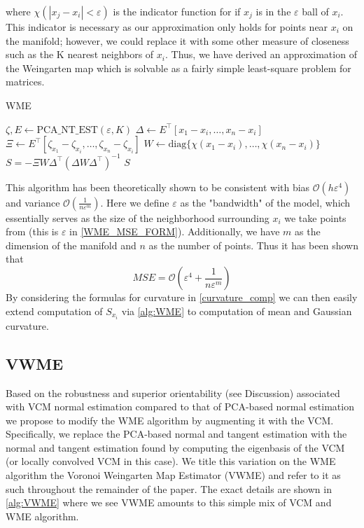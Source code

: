 \documentclass{article}
\begin{document}
where $\chi(|x_j - x_i| < \varepsilon)$ is the indicator function for if $x_j$ is in the $\varepsilon$ ball of $x_i$. This indicator is necessary as our approximation only holds for points near $x_i$ on the manifold; however, we could replace it with some other measure of closeness such as the K nearest neighbors of $x_i$. Thus, we have derived an approximation of the Weingarten map which is solvable as a fairly simple least-square problem for matrices.     
\begin{algorithm}
\caption{WME}\label{alg:WME}
\begin{algorithmic}[1]
\State $\zeta,  E \gets \text{PCA\_NT\_EST}(\varepsilon,K)$ 
\State $\Delta \gets E^\intercal [x_1 - x_i,\ldots,x_n - x_i]$
\State $\Xi \gets E^\intercal [\zeta_{x_1} - \zeta_{x_i}, \ldots, \zeta_{x_n} - \zeta_{x_i}]$
\State $W \gets \text{diag}\{\chi(x_1 - x_i),\ldots,\chi(x_n-x_i)\}$ 
\State $S = -\Xi W \Delta^\intercal (\Delta W \Delta^\intercal)^{-1}$ 
\State \Return $S$
\EndFunction
\end{algorithmic}
\end{algorithm}

This algorithm has been theoretically shown to be consistent with bias $\mathcal{O}(h\varepsilon^4)$ and variance $\mathcal{O}(\frac{1}{n\varepsilon^m})$. Here we define $\varepsilon$ as the "bandwidth" of the model, which essentially serves as the size of the neighborhood surrounding $x_i$ we take points from (this is $\varepsilon$ in \eqref{WME_MSE_FORM}). Additionally, we have $m$ as the dimension of the manifold and $n$ as the number of points. Thus it has been shown that 
$$MSE = \mathcal{O}(\varepsilon^4 + \frac{1}{n\varepsilon^m})$$
By considering the formulas for curvature in \eqref{curvature_comp} we can then easily extend computation of $S_{x_i}$ via \eqref{alg:WME} to computation of mean and Gaussian curvature.

\subsection{VWME}
Based on the robustness and superior orientability (see Discussion) associated with VCM normal estimation compared to that of PCA-based normal estimation we propose to modify the WME algorithm by augmenting it with the VCM. Specifically, we replace the PCA-based normal and tangent estimation with the normal and tangent estimation found by computing the eigenbasis of the VCM (or locally convolved VCM in this case). We title this variation on the WME algorithm the Voronoi Weingarten Map Estimator (VWME) and refer to it as such throughout the remainder of the paper. The exact details are shown in \eqref{alg:VWME} where we see VWME amounts to this simple mix of VCM and WME algorithm.       
\end{document}
